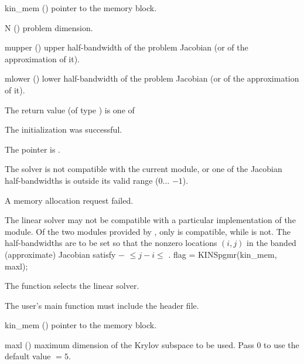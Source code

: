 {
  \begin{args}
  \item[kin\_mem] ()
    pointer to the {\kinsol} memory block.
  \item[N] ()
    problem dimension.
  \item[mupper] ()
    upper half-bandwidth of the problem Jacobian (or of the approximation of it).
  \item[mlower] ()
    lower half-bandwidth of the problem Jacobian (or of the approximation of it).
  \end{args}
}
{
  The return value  (of type ) is one of
  \begin{args}
  \item[\Id{KINBAND\_SUCCESS}] 
    The {\kinband} initialization was successful.
  \item[\Id{KINBAND\_MEM\_NULL}]
    The  pointer is .
  \item[\Id{KINBAND\_ILL\_INPUT}]
    The {\kinband} solver is not compatible with the current {\nvector} module, or
    one of the Jacobian half-bandwidths is outside its valid range
    ($0 \ldots$ $-1$).
  \item[\Id{KINBAND\_MEM\_FAIL}]
    A memory allocation request failed.
  \end{args}
}
{
  The {\kinband} linear solver may not be compatible with a particular
  implementation of the {\nvector} module. Of the two {\nvector} modules 
  provided by {\sundials}, only {\nvecs} is compatible, while {\nvecp} is not.
  The half-bandwidths are to be set so that the nonzero locations $(i,j)$ in the
  banded (approximate) Jacobian satisfy $-$ $\leq j-i \leq$ .
}
{
  flag = KINSpgmr(kin\_mem, maxl);
}
{
  The function  selects the {\kinspgmr} linear solver.

  The user's main function must include the  header file.
}
{
  \begin{args}
  \item[kin\_mem] ()
    pointer to the {\kinsol} memory block.
  \item[maxl] ()
    maximum dimension of the Krylov subspace to be used. Pass $0$ to use the 
    default value $=5$.
  \end{args}
}
